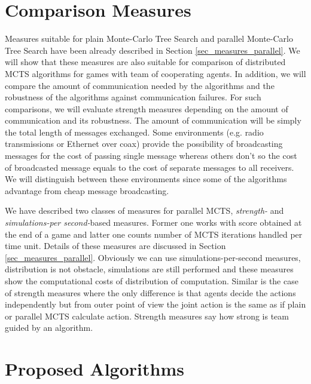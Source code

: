 
\section{Comparison Measures}
\label{sec_measures_distributed}

Measures suitable for plain Monte-Carlo Tree Search and parallel
Monte-Carlo Tree Search have been already described in Section \ref{sec_measures_parallel}.
We will show that these
measures are also suitable for comparison of distributed MCTS algorithms for games with team
of cooperating agents. In addition, we will compare the amount of communication needed by the
algorithms and the robustness of the algorithms against communication failures. For such
comparisons, we will evaluate strength measures depending on the amount of communication and
its robustness. The amount of communication will be simply the total length of messages
exchanged. Some environments (e.g. radio transmissions or Ethernet over coax) provide the 
possibility of broadcasting messages for the cost of passing single message whereas others 
don't so the cost of broadcasted message equals to the cost of separate messages to all
receivers. We will distinguish between these
environments since some of the algorithms advantage from cheap message broadcasting.

We have described two classes of measures for parallel MCTS, \emph{strength-} and
\emph{simulations-per second-}based measures. Former one works with score obtained at the end
of a game and latter one counts number of MCTS iterations handled per time unit. Details of
these measures are discussed in Section \ref{sec_measures_parallel}. Obviously we can use
simulations-per-second measures, distribution is not obstacle, simulations are still performed
and these measures show the computational costs of distribution of computation. Similar is the
case of strength measures where the only difference is that agents decide the actions
independently but from outer point of view the joint action is the same as if plain or parallel
MCTS calculate action. Strength measures say how strong is team guided by an algorithm.

\section{Proposed Algorithms}


